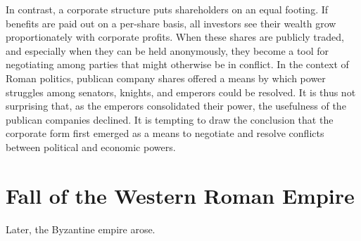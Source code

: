 \documentclass{article}
\begin{document}
    In contrast, a corporate structure puts shareholders on an equal footing. If benefits are paid out on a per-share basis, all investors see their wealth grow proportionately with corporate profits. When these shares are publicly traded, and especially when they can be held anonymously, they become a tool for negotiating among parties that might otherwise be in conflict. In the context of Roman politics, publican company shares offered a means by which power struggles among senators, knights, and emperors could be resolved. It is thus not surprising that, as the emperors consolidated their power, the usefulness of the publican companies declined. It is tempting to draw the conclusion that the corporate form first emerged as a means to negotiate and resolve conflicts between political and economic powers.

\section{Fall of the Western Roman Empire}

  Later, the Byzantine empire arose. 
\end{document}
